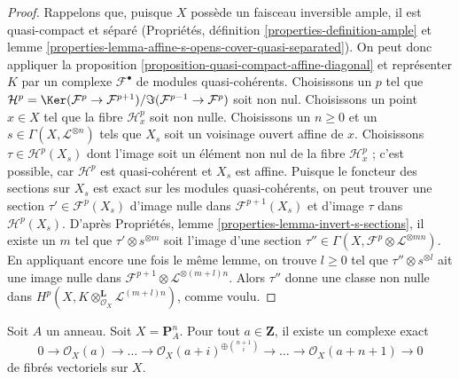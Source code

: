 \begin{proof}
Rappelons que, puisque $X$ possède un faisceau inversible ample, il est quasi-compact
et séparé (Propriétés, définition \ref{properties-definition-ample} et
lemme \ref{properties-lemma-affine-s-opens-cover-quasi-separated}).
On peut donc appliquer la
proposition \ref{proposition-quasi-compact-affine-diagonal}
et représenter $K$ par un complexe $\mathcal{F}^\bullet$ de
modules quasi-cohérents. Choisissons un $p$ tel que
$\mathcal{H}^p = \Ker(\mathcal{F}^p \to \mathcal{F}^{p + 1})/
\Im(\mathcal{F}^{p - 1} \to \mathcal{F}^p)$ soit non nul.
Choisissons un point $x \in X$ tel que la fibre $\mathcal{H}^p_x$ soit
non nulle. Choisissons un $n \geq 0$ et un $s \in \Gamma(X, \mathcal{L}^{\otimes n})$
tels que $X_s$ soit un voisinage ouvert affine de $x$.
Choisissons $\tau \in \mathcal{H}^p(X_s)$ dont l'image soit un élément non nul
de la fibre $\mathcal{H}^p_x$ ; c'est possible,
car $\mathcal{H}^p$ est quasi-cohérent et $X_s$ est affine.
Puisque le foncteur des sections sur $X_s$ est exact sur les
modules quasi-cohérents, on peut trouver une section $\tau' \in \mathcal{F}^p(X_s)$
d'image nulle dans $\mathcal{F}^{p + 1}(X_s)$ et d'image
$\tau$ dans $\mathcal{H}^p(X_s)$. D'après
Propriétés, lemme \ref{properties-lemma-invert-s-sections},
il existe un $m$ tel que $\tau' \otimes s^{\otimes m}$
soit l'image d'une section
$\tau'' \in \Gamma(X, \mathcal{F}^p \otimes \mathcal{L}^{\otimes mn})$.
En appliquant encore une fois le même lemme, on trouve $l \geq 0$ tel que
$\tau'' \otimes s^{\otimes l}$ ait une image nulle dans
$\mathcal{F}^{p + 1} \otimes \mathcal{L}^{\otimes (m + l)n}$.
Alors $\tau''$ donne une classe non nulle dans
$H^p(X, K \otimes^\mathbf{L}_{\mathcal{O}_X} \mathcal{L}^{(m + l)n})$,
comme voulu.
\end{proof}

\begin{lemma}
\label{lemma-construct-the-next-one}
Soit $A$ un anneau. Soit $X = \mathbf{P}^n_A$. Pour tout $a \in \mathbf{Z}$,
il existe un complexe exact
$$
0 \to \mathcal{O}_X(a) \to \ldots
\to \mathcal{O}_X(a + i)^{\oplus {n + 1 \choose i}} \to
\ldots \to \mathcal{O}_X(a + n + 1) \to 0
$$
de fibrés vectoriels sur $X$.
\end{lemma}

